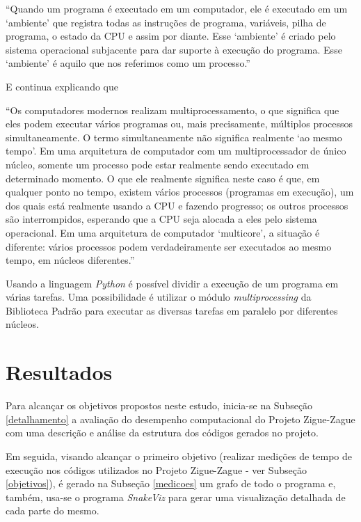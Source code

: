 \documentclass[12pt]{article}
\newcommand{\aspas}[1]{``#1''} %
\newcommand{\citacao}[1]{
	\singlespacing %
	\begin{flushright}
		\begin{minipage}{0.75\linewidth} %
			{\fontsize{10}{\baselineskip}\selectfont \aspas{#1}}
		\end{minipage}
	\end{flushright}
	\onehalfspacing %
}
\begin{document}
\citacao{Quando um programa é executado em um computador, ele é executado em um `ambiente' que registra todas as instruções de programa, variáveis, pilha de programa, o estado da CPU e assim por diante. Esse `ambiente' é criado pelo sistema operacional subjacente para dar suporte à execução do programa. Esse `ambiente' é aquilo que nos referimos como um processo.}

\noindent E continua explicando que 

\citacao{Os computadores modernos realizam multiprocessamento, o que significa que eles podem executar vários
	programas ou, mais precisamente, múltiplos processos simultaneamente. O termo simultaneamente não significa realmente `ao mesmo tempo'. Em uma arquitetura de computador com um multiprocessador de único núcleo, somente
	um processo pode estar realmente sendo executado em determinado momento. O que ele realmente significa neste
	caso é que, em qualquer ponto no tempo, existem vários processos (programas em execução), um dos quais está
	realmente usando a CPU e fazendo progresso; os outros processos são interrompidos, esperando que a CPU seja
	alocada a eles pelo sistema operacional. Em uma arquitetura de computador `multicore', a situação é diferente: vários
	processos podem verdadeiramente ser executados ao mesmo tempo, em núcleos diferentes.}

Usando a linguagem \textit{Python} é possível dividir a execução de um programa em várias tarefas. Uma possibilidade é utilizar o módulo \textit{multiprocessing} da Biblioteca Padrão para executar as diversas tarefas em paralelo por diferentes núcleos.


\section{Resultados}

Para alcançar os objetivos propostos neste estudo, inicia-se na Subseção \ref{detalhamento} a avaliação do desempenho computacional do Projeto Zigue-Zague com uma descrição e análise da estrutura dos códigos gerados no projeto.

Em seguida, visando alcançar o primeiro objetivo (realizar medições de tempo de execução nos códigos utilizados no Projeto Zigue-Zague - ver Subseção \ref{objetivos}), é gerado na Subseção \ref{medicoes} um grafo de todo o programa e, também, usa-se o programa \textit{SnakeViz} para gerar uma visualização detalhada de cada parte do mesmo.
\end{document}
